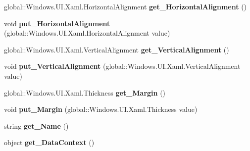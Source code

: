 \begin{DoxyCompactItemize}
global\+::\+Windows.\+U\+I.\+Xaml.\+Horizontal\+Alignment {\bfseries get\+\_\+\+Horizontal\+Alignment} ()
\item 
\mbox{\label{interface_windows_1_1_u_i_1_1_xaml_1_1_i_framework_element_a94803d051b65803464005eaca8d55c70}} 
void {\bfseries put\+\_\+\+Horizontal\+Alignment} (global\+::\+Windows.\+U\+I.\+Xaml.\+Horizontal\+Alignment value)
\item 
\mbox{\label{interface_windows_1_1_u_i_1_1_xaml_1_1_i_framework_element_a5c99e9c5ee87e9df550209699e7666f7}} 
global\+::\+Windows.\+U\+I.\+Xaml.\+Vertical\+Alignment {\bfseries get\+\_\+\+Vertical\+Alignment} ()
\item 
\mbox{\label{interface_windows_1_1_u_i_1_1_xaml_1_1_i_framework_element_aad18ff5b25e09bbbcc7f6a3b5519e4ab}} 
void {\bfseries put\+\_\+\+Vertical\+Alignment} (global\+::\+Windows.\+U\+I.\+Xaml.\+Vertical\+Alignment value)
\item 
\mbox{\label{interface_windows_1_1_u_i_1_1_xaml_1_1_i_framework_element_a4b7dbc2a4b60e47ea9bfe8bc5ee3ad33}} 
global\+::\+Windows.\+U\+I.\+Xaml.\+Thickness {\bfseries get\+\_\+\+Margin} ()
\item 
\mbox{\label{interface_windows_1_1_u_i_1_1_xaml_1_1_i_framework_element_a38f9babd2b0b51bb24956c953463c95b}} 
void {\bfseries put\+\_\+\+Margin} (global\+::\+Windows.\+U\+I.\+Xaml.\+Thickness value)
\item 
\mbox{\label{interface_windows_1_1_u_i_1_1_xaml_1_1_i_framework_element_a1e142daabb976702923de9dd5bad0e79}} 
string {\bfseries get\+\_\+\+Name} ()
\item 
\mbox{\label{interface_windows_1_1_u_i_1_1_xaml_1_1_i_framework_element_a85f9478adc486dc6da6301bf424b0bec}} 
object {\bfseries get\+\_\+\+Data\+Context} ()
\item 
\mbox{\label{interface_windows_1_1_u_i_1_1_xaml_1_1_i_framework_element_a61847908f27c9feb7e9307fccd243aa7}} 

\end{DoxyCompactItemize}
